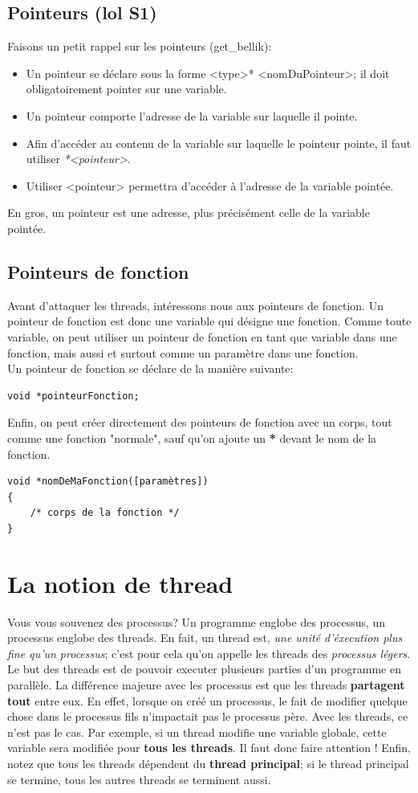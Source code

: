 \documentclass{report}
\begin{document}
\subsection{Pointeurs (lol S1)}
Faisons un petit rappel sur les pointeurs (get\_bellik):
\begin{itemize}
\item{Un pointeur se déclare sous la forme <type>* <nomDuPointeur>; il doit obligatoirement pointer sur une variable.}
\item{Un pointeur comporte l’adresse de la variable sur laquelle il pointe.}
\item{Afin d’accéder au contenu de la variable sur laquelle le pointeur pointe, il faut utiliser \emph{*<pointeur>}}.
\item{Utiliser <pointeur> permettra d’accéder à l’adresse de la variable pointée.}
\end{itemize}
En gros, un pointeur est une adresse, plus précisément celle de la variable pointée.

\subsection{Pointeurs de fonction}
Avant d'attaquer les threads, intéressons nous aux pointeurs de fonction.
Un pointeur de fonction est donc une variable qui désigne une fonction. Comme toute variable, on peut utiliser un pointeur de fonction en tant que variable dans une fonction, mais aussi et surtout comme un paramètre dans une fonction.\\
Un pointeur de fonction se déclare de la manière suivante:
\begin{verbatim}
void *pointeurFonction;
\end{verbatim}
Enfin, on peut créer directement des pointeurs de fonction avec un corps, tout comme une fonction "normale", sauf qu'on ajoute un \textbf{*} devant le nom de la fonction.
\begin{verbatim}
void *nomDeMaFonction([paramètres])
{
	/* corps de la fonction */
}
\end{verbatim}


\section{La notion de thread}
Vous vous souvenez des processus? Un programme englobe des processus, un processus englobe des threads. 
En fait, un thread est, \emph{une unité d'éxecution plus fine qu'un processus}; c'est pour cela qu'on appelle les threads des \emph{processus légers}.\\
Le but des threads est de pouvoir executer plusieurs parties d'un programme en parallèle. 
La différence majeure avec les processus est que les threads \textbf{partagent tout} entre eux. 
En effet, lorsque on créé un processus, le fait de modifier quelque chose dans le processus fils n'impactait pas le processus père. 
Avec les threads, ce n'est pas le cas. Par exemple, si un thread modifie une variable globale, cette variable sera modifiée pour \textbf{tous les threads}.
Il faut donc faire attention !
Enfin, notez que tous les threads dépendent du \textbf{thread principal}; si le thread principal se termine, tous les autres threads se terminent aussi.
\end{document}
